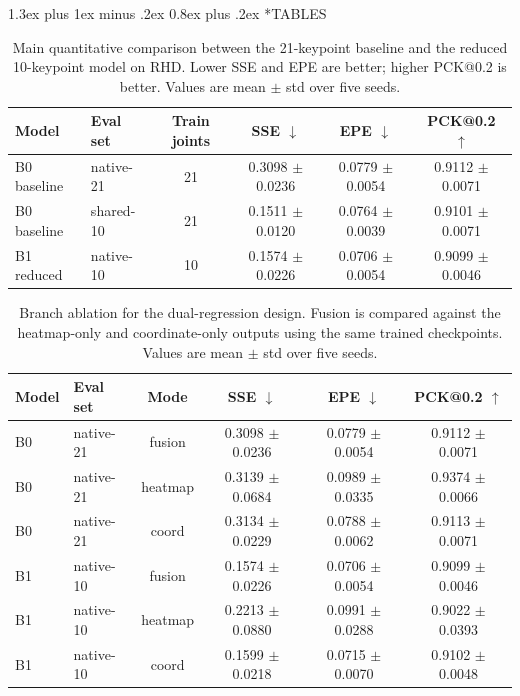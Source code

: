 \documentclass[10pt,letterpaper,twocolumn]{article}
\makeatletter
\renewcommand\section{\@startsection{section}{1}{\z@}%
  {1.3ex plus 1ex minus .2ex}%
  {0.8ex plus .2ex}%
  {\centering\normalfont\small\scshape}}
\makeatother
\begin{document}
\clearpage
\onecolumn
\section*{TABLES}

\begin{table}[H]
\centering
\footnotesize
\caption{Main quantitative comparison between the 21-keypoint baseline and the reduced 10-keypoint model on RHD. Lower SSE and EPE are better; higher PCK@0.2 is better. Values are mean $\pm$ std over five seeds.}
\label{tab:main_accuracy}
\begin{tabular}{llcccc}
\toprule
Model & Eval set & Train joints & SSE $\downarrow$ & EPE $\downarrow$ & PCK@0.2 $\uparrow$ \\
\midrule
B0 baseline & native-21 & 21 & 0.3098 $\pm$ 0.0236 & 0.0779 $\pm$ 0.0054 & 0.9112 $\pm$ 0.0071 \\
B0 baseline & shared-10 & 21 & 0.1511 $\pm$ 0.0120 & 0.0764 $\pm$ 0.0039 & 0.9101 $\pm$ 0.0071 \\
B1 reduced & native-10 & 10 & 0.1574 $\pm$ 0.0226 & 0.0706 $\pm$ 0.0054 & 0.9099 $\pm$ 0.0046 \\
\bottomrule
\end{tabular}
\end{table}

\begin{table}[H]
\centering
\footnotesize
\caption{Branch ablation for the dual-regression design. Fusion is compared against the heatmap-only and coordinate-only outputs using the same trained checkpoints. Values are mean $\pm$ std over five seeds.}
\label{tab:branch_ablation}
\begin{tabular}{llcccc}
\toprule
Model & Eval set & Mode & SSE $\downarrow$ & EPE $\downarrow$ & PCK@0.2 $\uparrow$ \\
\midrule
B0 & native-21 & fusion & 0.3098 $\pm$ 0.0236 & 0.0779 $\pm$ 0.0054 & 0.9112 $\pm$ 0.0071 \\
B0 & native-21 & heatmap & 0.3139 $\pm$ 0.0684 & 0.0989 $\pm$ 0.0335 & 0.9374 $\pm$ 0.0066 \\
B0 & native-21 & coord & 0.3134 $\pm$ 0.0229 & 0.0788 $\pm$ 0.0062 & 0.9113 $\pm$ 0.0071 \\
B1 & native-10 & fusion & 0.1574 $\pm$ 0.0226 & 0.0706 $\pm$ 0.0054 & 0.9099 $\pm$ 0.0046 \\
B1 & native-10 & heatmap & 0.2213 $\pm$ 0.0880 & 0.0991 $\pm$ 0.0288 & 0.9022 $\pm$ 0.0393 \\
B1 & native-10 & coord & 0.1599 $\pm$ 0.0218 & 0.0715 $\pm$ 0.0070 & 0.9102 $\pm$ 0.0048 \\
\bottomrule
\end{tabular}
\end{table}
\end{document}
